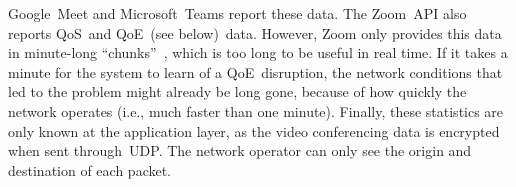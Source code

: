         Google~Meet and Microsoft~Teams report these data. The Zoom~API also reports QoS~and QoE~(see below)~data. However, Zoom only provides this data in minute-long \enquote{chunks}~\autocite{walia2019}, which is too long to be useful in real time. If it takes a minute for the system to learn of a QoE~disruption, the network conditions that led to the problem might already be long gone, because of how quickly the network operates (i.e., much faster than one minute). Finally, these statistics are only known at the application layer, as the video conferencing data is encrypted when sent through~UDP. The network operator can only see the origin and destination of each packet.



